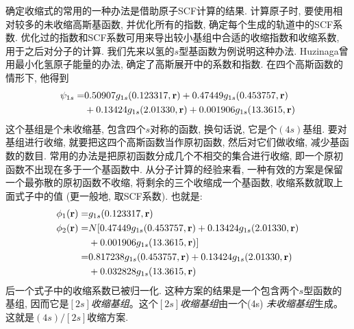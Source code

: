 确定收缩式的常用的一种办法是借助原子SCF计算的结果. 
计算原子时, 
要使用相对较多的未收缩高斯基函数, 
并优化所有的指数, 
确定每个生成的轨道中的SCF系数. 
优化过的指数和SCF系数可用来导出较小基组中合适的收缩指数和收缩系数, 
用于之后对分子的计算. 
我们先来以氢的$s$型基函数为例说明这种办法. 
Huzinaga曾用最小化氢原子能量的办法, 
确定了高斯展开中的系数和指数. 
在四个高斯函数的情形下, 
他得到
\begin{align}
	\psi_{1s} = &   0.50907g_{1s}(0.123317,\mathbf{r}) + 0.47449 g_{1s}(0.453757,\mathbf{r}) \notag\\
	& + 0.13424 g_{1s}(2.01330,\mathbf{r}) + 0.001906 g_{1s}(13.3615,\mathbf{r})
\end{align}
这个基组是个未收缩基, 
包含四个$s$对称的函数, 
换句话说, 
它是个$(4s)$基组. 
要对基组进行收缩, 
就要把这四个高斯函数当作原初函数, 
然后对它们做收缩, 
减少基函数的数目. 
常用的办法是把原初函数分成几个不相交的集合进行收缩, 
即一个原初函数不出现在多于一个基函数中. 
从分子计算的经验来看, 
一种有效的方案是保留一个最弥散的原初函数不收缩, 
将剩余的三个收缩成一个基函数, 
收缩系数就取上面式子中的值 (更一般地, 
取SCF系数). 
也就是:
\begin{align}
	\phi_1(\mathbf{r}) = & g_{1s}(0.123317,\mathbf{r})                                               \\
	\phi_2(\mathbf{r}) = & N[0.47449g_{1s}(0.453757,\mathbf{r})+ 0.13424 g_{1s}(2.01330,\mathbf{r}) \notag \\
	& + 0.001906 g_{1s}(13.3615,\mathbf{r})]                                    \\
	=              & 0.817238g_{1s}(0.453757,\mathbf{r})+ 0.13424 g_{1s}(2.01330,\mathbf{r})         \\
	& +0.032828 g_{1s}(13.3615,\mathbf{r})
\end{align}
后一个式子中的收缩系数已被归一化. 
这种方案的结果是一个包含两个$s$型函数的基组, 
因而它是\emph{$[2s]$收缩基组}。这个\emph{$[2s]$收缩基组}由一个(4s) \emph{未收缩基组}生成。 
这就是$(4s)/[2s]$收缩方案.


